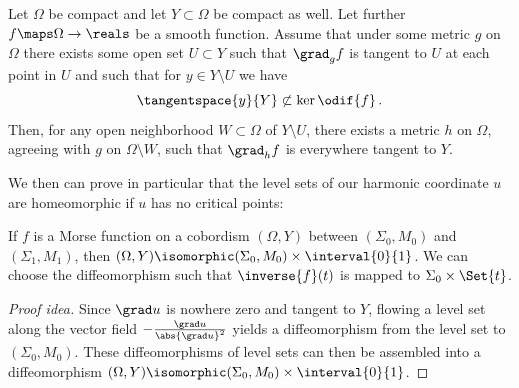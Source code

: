 \documentclass[titlepage,numbers=noenddot,oneside,%
cleardoublepage=empty,paper=a4,fontsize=11pt,%
english,%
]{scrartcl}
\newcommand*{\mathfullstop}{\,.}
\begin{document}
\begin{lemma}\label{lem:realize_harmonic_function_as_morse_function}
    Let \( \Omega \) be compact and let \( Y\subset \Omega \) be compact as well. Let further \( f\maps \Omega\to \reals \) be a smooth function. Assume that under some metric \( g \) on \( \Omega \) there exists some open set \( U\subset Y \) such that \( \grad_g f \) is tangent to \( U \) at each point in \( U \) and such that for \( y\in Y\setminus U \) we have 
    \begin{equation*}
        \tangentspace{y}{Y}\not\subset \ker\odif{f}\mathfullstop
    \end{equation*}
    Then, for any open neighborhood \( W\subset \Omega \) of \( Y\setminus U \), there exists a metric \( h \) on \( \Omega \), agreeing with \( g \) on \( \Omega\setminus W \), such that \( \grad_h f \) is everywhere tangent to \( Y \).
\end{lemma}
We then can prove in particular that the level sets of our harmonic coordinate \( u \) are homeomorphic if \( u \) has no critical points: 
\begin{lemma}\label{lem:morse_function_without_critical_points_level_sets_diffeo}
    If \( f \) is a Morse function on a cobordism \( (\Omega,Y) \) between \( (\Sigma_0,M_0) \) and \( (\Sigma_1,M_1) \), then \( (\Omega,Y)\isomorphic (\Sigma_0,M_0)\times \interval{0}{1} \). We can choose the diffeomorphism such that \( \inverse{f}(t) \) is mapped to \( \Sigma_0\times \Set{t} \).
\end{lemma}
\begin{proof}[Proof idea]
    Since \( \grad u \) is nowhere zero and tangent to \( Y \), flowing a level set along the vector field \( -\frac{\grad u}{\abs{\grad u}^2} \) yields a diffeomorphism from the level set to \( (\Sigma_0,M_0) \). These diffeomorphisms of level sets can then be assembled into a diffeomorphism \( (\Omega,Y)\isomorphic (\Sigma_0,M_0)\times \interval{0}{1}  \).
\end{proof}
% 
\printbibliography
\end{document}
